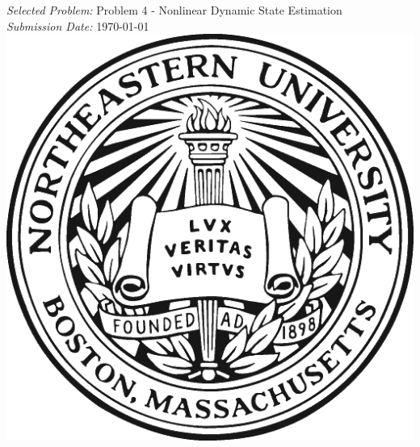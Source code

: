 \begin{titlepage}

\vspace{3cm}


{\large \emph{Selected Problem:} Problem 4 - Nonlinear Dynamic State Estimation}\\[2cm] %


{\large \emph{Submission Date:} \today }\\[2cm] %


\includegraphics{neuS_bB.png}\\[1cm] %
 

\vfill %

\end{titlepage}


